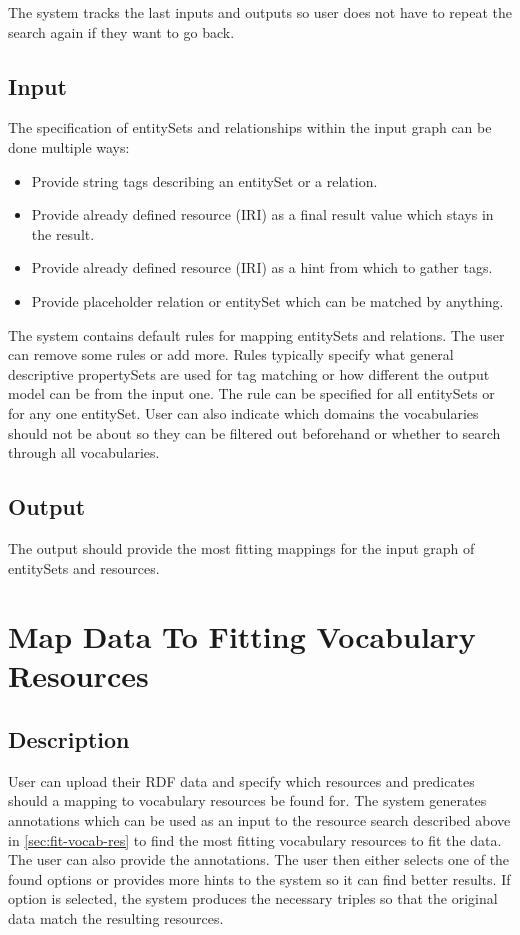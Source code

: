 The system tracks the last inputs and outputs so user does not have to repeat the search again if they want to go back. 

\subsection{Input}
The specification of entitySets and relationships within the input graph can be done multiple ways:
\begin{itemize}
    \item Provide string tags describing an entitySet or a relation.
    \item Provide already defined resource (IRI) as a final result value which stays in the result.
    \item Provide already defined resource (IRI) as a hint from which to gather tags.
    \item Provide placeholder relation or entitySet which can be matched by anything.
\end{itemize}

The system contains default rules for mapping entitySets and relations. The user can remove some rules or add more. Rules typically specify what general descriptive propertySets are used for tag matching or how different the output model can be from the input one. The rule can be specified for all entitySets or for any one entitySet. User can also indicate which domains the vocabularies should not be about so they can be filtered out beforehand or whether to search through all vocabularies.

\subsection{Output}
The output should provide the most fitting mappings for the input graph of entitySets and resources.

\section{Map Data To Fitting Vocabulary Resources}
\subsection{Description}
User can upload their RDF data and specify which resources and predicates should a mapping to vocabulary resources be found for. The system generates annotations which can be used as an input to the resource search described above in \autoref{sec:fit-vocab-res} to find the most fitting vocabulary resources to fit the data. The user can also provide the annotations. The user then either selects one of the found options or provides more hints to the system so it can find better results. If option is selected, the system produces the necessary triples so that the original data match the resulting resources.

